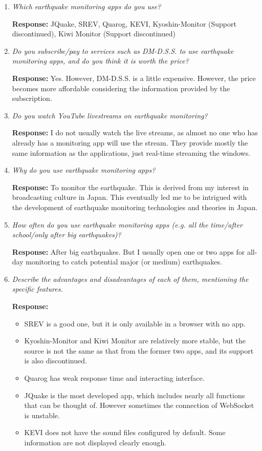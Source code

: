 \begin{enumerate}
    \item \textit{Which earthquake monitoring apps do you use?}

          \textbf{Response:} JQuake, SREV, Quarog, KEVI, Kyoshin-Monitor (Support discontinued), Kiwi Monitor (Support discontinued)

    \item \textit{Do you subscribe/pay to services such as DM-D.S.S. to use earthquake monitoring apps, and do you think it is worth the price?}

          \textbf{Response:} Yes. However, DM-D.S.S. is a little expensive. However, the price becomes more affordable considering the information provided by the subscription.

    \item \textit{Do you watch YouTube livestreams on earthquake monitoring?}

          \textbf{Response:} I do not usually watch the live streams, as almost no one who has already has a monitoring app will use the stream. They provide mostly the same information as the applications, just real-time streaming the windows.

    \item \textit{Why do you use earthquake monitoring apps?}

          \textbf{Response:} To monitor the earthquake. This is derived from my interest in broadcasting culture in Japan. This eventually led me to be intrigued with the development of earthquake monitoring technologies and theories in Japan.

    \item \textit{How often do you use earthquake monitoring apps (e.g. all the time/after school/only after big earthquakes)?}

          \textbf{Response:} After big earthquakes. But I usually open one or two apps for all-day monitoring to catch potential major (or medium) earthquakes.

    \item \textit{Describe the advantages and disadvantages of each of them, mentioning the specific features.}

          \textbf{Response:}
          \begin{itemize}
              \item SREV is a good one, but it is only available in a browser with no app.
              \item Kyoshin-Monitor and Kiwi Monitor are relatively more stable, but the source is not the same as that from the former two apps, and its support is also discontinued.
              \item Quarog has weak response time and interacting interface.
              \item JQuake is the most developed app, which includes nearly all functions that can be thought of. However sometimes the connection of WebSocket is unstable.
              \item KEVI does not have the sound files configured by default. Some information are not displayed clearly enough.
          \end{itemize}


\end{enumerate}

